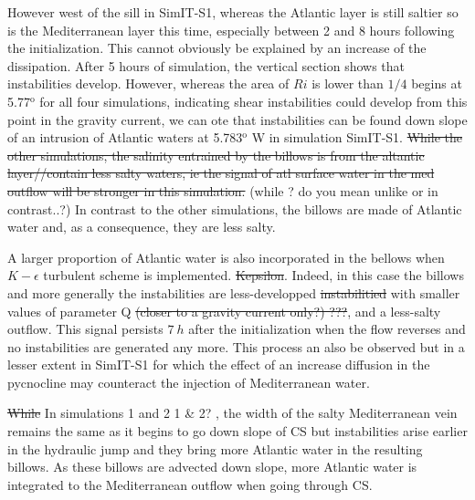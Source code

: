 \color{blue}However west of the sill in SimIT-S1, whereas the Atlantic layer is still saltier so is the Mediterranean layer this time, especially between 2 and 8 hours following the initialization. This cannot obviously be explained by an increase of the dissipation.\color{black} After 5 hours of simulation, the vertical section shows that instabilities develop.  \color{blue}However, whereas the area of $Ri$ is lower than $1/4$ begins at 5.77$^\text{o}$ for all four simulations, indicating shear instabilities could develop from this point in the gravity current, we can ote that instabilities can be found down slope of an intrusion of Atlantic waters at 5.783$^\text{o}$ W in simulation SimIT-S1. \color{black}
\sout{While the other simulations, the salinity entrained by the billows is from the altantic layer//contain less salty waters, ie the signal of atl surface water in the med outflow will be stronger in this simulation.} \color{green}(while ? do you mean unlike or in contrast..?) \color{black}
 \color{blue}In contrast to the other simulations, the billows are made of Atlantic water and, as a consequence, they are less salty. \color{black}
 
\color{blue}A larger proportion of Atlantic water is also incorporated in the bellows when $K-\epsilon$ turbulent scheme is implemented. \sout{Kepsilon}. Indeed, in this case the billows and more generally the instabilities are less-developped \sout{instabilitied} with smaller values of parameter Q  \sout{(closer to a gravity current only?) ???}, and a less-salty outflow. This signal persists  \color{blue}$7\ h$ after the initialization when the flow reverses and no instabilities are generated any more. This process an also be observed but in a lesser extent in SimIT-S1 for which the effect of an increase diffusion in the pycnocline may counteract the injection of Mediterranean water. \color{black}

\sout{While} \color{blue}In simulations 1 and 2  \color{green}1 \& 2? \color{blue}, the width of the salty Mediterranean vein remains the same as it begins to go down slope of CS but instabilities arise earlier in the hydraulic jump and they bring more Atlantic water in the resulting billows. As these billows are advected down slope, more Atlantic water is integrated to the Mediterranean outflow when going through CS. \color{black} 


